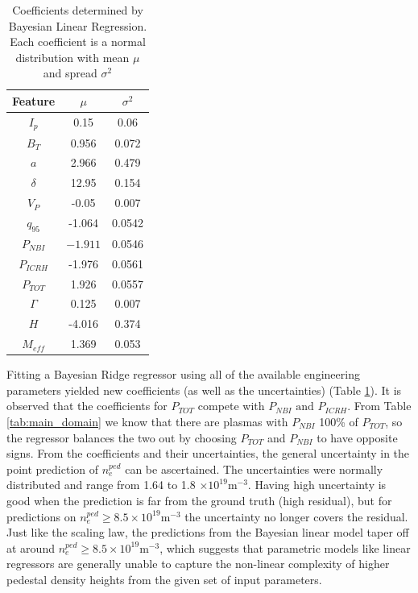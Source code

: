 \documentclass[a4paper, twoside, final, 12pt]{article}
\begin{document}
{%
\begin{table}
\centering
\caption{Coefficients determined by Bayesian Linear Regression. Each coefficient is a normal distribution with mean $\mu$ and spread $\sigma^2$}\label{tab:new_coef}
\begin{tabular}{ | c | c | c |}
			\hline
			Feature & $\mu$ & $\sigma^2$ \\
			\hline
			$I_p$ & 0.15 & 0.06 \\
			$B_T$ & 0.956 & 0.072 \\
			$a$ & 2.966 & 0.479 \\
			$\delta$ & 12.95 & 0.154 \\
			$V_P$ & -0.05 & 0.007 \\
			$q_{95}$ & -1.064 & 0.0542 \\
			$P_{NBI}$ & $-1.911$ & 0.0546 \\
			$P_{ICRH}$ & -1.976 & 0.0561 \\
			$P_{TOT}$ & 1.926 & 0.0557 \\
			$\Gamma$ & 0.125 & 0.007 \\
			$H$ & -4.016 & 0.374  \\
			$M_{eff}$ & 1.369 & 0.053 \\
			\hline
\end{tabular}
\end{table}
Fitting a Bayesian Ridge regressor using all of the available engineering parameters yielded new coefficients (as well as the uncertainties) (Table \ref{tab:new_coef}). It is observed that the coefficients for $P_{TOT}$ compete with $P_{NBI} \text{ and }  P_{ICRH}$. 
From Table \ref{tab:main_domain} we know that there are plasmas with $P_{NBI}$ 100\% of $P_{TOT}$, so the regressor balances the two out by choosing $P_{TOT}$ and $P_{NBI}$ to have opposite signs.     
From the coefficients and their uncertainties, the general uncertainty in the point prediction of $n_e^{ped}$ can be ascertained. The uncertainties were normally distributed and range from 1.64 to 1.8 $ \times 10^{19}\text{m}^{-3}$. Having high uncertainty is good when the prediction is far from the ground truth (high residual), but for predictions on $n_e^{ped} \geq 8.5 \times  10^{19}\text{m}^{-3}$ the uncertainty no longer covers the residual. 
Just like the scaling law, the predictions from the Bayesian linear model taper off at around $n_e^{ped} \geq 8.5 \times 10^{19}\text{m}^{-3}$, which suggests that parametric models like linear regressors are generally unable to capture the non-linear complexity of higher pedestal density heights from the given set of input parameters.


}
\end{document}
